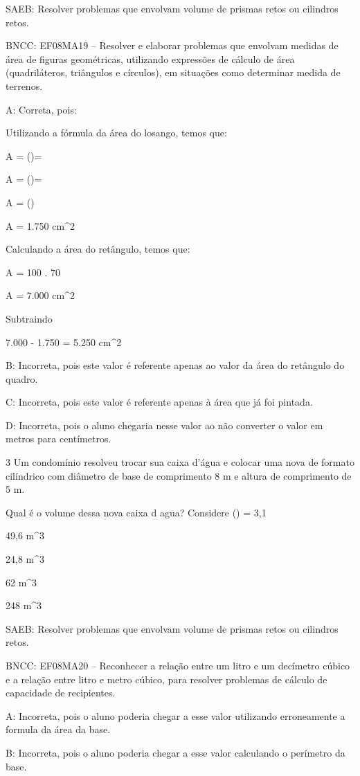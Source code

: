 {SAEB: Resolver problemas que envolvam volume de prismas retos ou
cilindros retos.

BNCC: EF08MA19 -- Resolver e elaborar problemas que envolvam medidas de
área de figuras geométricas, utilizando expressões de cálculo de área
(quadriláteros, triângulos e círculos), em situações como determinar
medida de terrenos.

A: Correta, pois:

Utilizando a fórmula da área do losango, temos que:

A = ()=

A = ()=

A = ()

A = 1.750 cm^2

Calculando a área do retângulo, temos que:

A = 100 . 70

A = 7.000 cm^2

Subtraindo

7.000 - 1.750 = 5.250 cm^2

B: Incorreta, pois este valor é referente apenas ao valor da área do
retângulo do quadro.

C: Incorreta, pois este valor é referente apenas à área que já foi
pintada.

D: Incorreta, pois o aluno chegaria nesse valor ao não converter o valor
em metros para centímetros.

\num{3} Um condomínio resolveu trocar sua caixa d'água e colocar uma nova de
formato cilíndrico com diâmetro de base de comprimento 8 m e altura de
comprimento de 5 m.

Qual é o volume dessa nova caixa d agua? Considere () = 3,1
\item 49,6 m^3
\item 24,8 m^3
\item 62 m^3
\item 248 m^3

SAEB: Resolver problemas que envolvam volume de prismas retos ou
cilindros retos.

BNCC: EF08MA20 -- Reconhecer a relação entre um litro e um decímetro
cúbico e a relação entre litro e metro cúbico, para resolver problemas
de cálculo de capacidade de recipientes.

A: Incorreta, pois o aluno poderia chegar a esse valor utilizando
erroneamente a formula da área da base.

B: Incorreta, pois o aluno poderia chegar a esse valor calculando o
perímetro da base.

}
